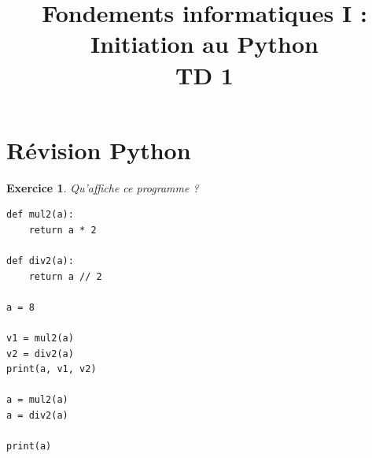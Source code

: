 \documentclass[11pt]{article}
\title{Fondements informatiques I : Initiation au  Python\\
TD 1}
\newcommand{\correction}{
\renewenvironment{note}{
~\hspace*{-0.1cm} \hrulefill\\ \textbf{Notes.}~\\
}
{
~\hspace*{-0.1cm} \hrulefill
}
}
\newtheorem{exercice}{Exercice}[section]
\begin{document}
\date{}
\maketitle


\section{Révision Python}






\bigskip

\begin{exercice}
Qu'affiche ce programme ?
\begin{verbatim}
def mul2(a):
    return a * 2

def div2(a):
    return a // 2   
         
a = 8

v1 = mul2(a)
v2 = div2(a)
print(a, v1, v2)

a = mul2(a)  
a = div2(a)  

print(a)
\end{verbatim}
\end{exercice}
\end{document}
